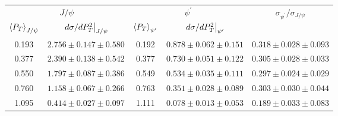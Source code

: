 \begin{tabular}{cc|cc|c}
\hline
\multicolumn{2}{c|}{$J/\psi$} &
  \multicolumn{2}{c|}{$\psi^{\prime}$} &
  \multirow{2}{*}{$\sigma_{\psi^\prime}/\sigma_{J/\psi}$} \\ \cline{1-4}
$\expval{P_T}_{J/\psi}$ &
  $\eval{d\sigma/dP^2_T}_{J/\psi}$ &
  $\expval{P_T}_{\psi^\prime}$ &
  $\eval{d\sigma/dP^2_T}_{\psi^\prime}$ &
   \\ \hline
0.193 & $2.756\pm0.147\pm0.580$ & 0.192 & $0.878\pm0.062\pm0.151$ & $0.318\pm0.028\pm0.093$ \\
0.377 & $2.390\pm0.138\pm0.542$ & 0.377 & $0.730\pm0.051\pm0.122$ & $0.305\pm0.028\pm0.033$ \\
0.550 & $1.797\pm0.087\pm0.386$ & 0.549 & $0.534\pm0.035\pm0.111$ & $0.297\pm0.024\pm0.029$ \\
0.760 & $1.158\pm0.067\pm0.266$ & 0.763 & $0.351\pm0.028\pm0.089$ & $0.303\pm0.030\pm0.044$ \\
1.095 & $0.414\pm0.027\pm0.097$ & 1.111 & $0.078\pm0.013\pm0.053$ & $0.189\pm0.033\pm0.083$ \\ \hline
\end{tabular}
